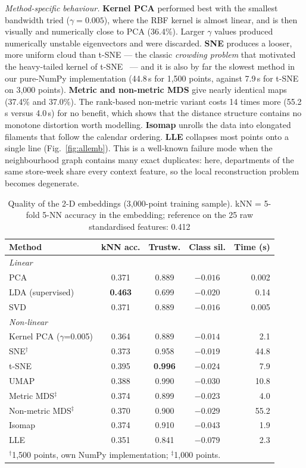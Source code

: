 \emph{Method-specific behaviour.} \textbf{Kernel PCA} performed best with the smallest bandwidth tried ($\gamma=0.005$), where the RBF kernel is almost linear, and is then visually and numerically close to PCA (36.4\%). Larger $\gamma$ values produced numerically unstable eigenvectors and were discarded. \textbf{SNE} produces a looser, more uniform cloud than t-SNE --- the classic \emph{crowding problem} that motivated the heavy-tailed kernel of t-SNE~\cite{vandermaaten2008} --- and it is also by far the slowest method in our pure-NumPy implementation (44.8\,s for 1{,}500 points, against 7.9\,s for t-SNE on 3{,}000 points). \textbf{Metric and non-metric MDS} give nearly identical maps (37.4\% and 37.0\%). The rank-based non-metric variant costs 14 times more (55.2\,s versus 4.0\,s) for no benefit, which shows that the distance structure contains no monotone distortion worth modelling. \textbf{Isomap} unrolls the data into elongated filaments that follow the calendar ordering. \textbf{LLE} collapses most points onto a single line (Fig.~\ref{fig:allemb}). This is a well-known failure mode when the neighbourhood graph contains many exact duplicates: here, departments of the same store-week share every context feature, so the local reconstruction problem becomes degenerate.

\begin{table}[!t]
\caption{Quality of the 2-D embeddings (3{,}000-point training sample). kNN = 5-fold 5-NN accuracy in the embedding; reference on the 25 raw standardised features: 0.412}
\label{tab:emb}
\centering
\setlength{\tabcolsep}{4pt}
\begin{tabular}{lcccr}
\toprule
Method & kNN acc. & Trustw. & Class sil. & Time (s) \\
\midrule
\multicolumn{5}{l}{\emph{Linear}}\\
PCA & 0.371 & 0.889 & $-0.016$ & 0.002 \\
LDA (supervised) & \textbf{0.463} & 0.699 & $-0.020$ & 0.14 \\
SVD & 0.371 & 0.889 & $-0.016$ & 0.005 \\
\midrule
\multicolumn{5}{l}{\emph{Non-linear}}\\
Kernel PCA ($\gamma$=0.005) & 0.364 & 0.889 & $-0.014$ & 2.1 \\
SNE$^\dagger$ & 0.373 & 0.958 & $-0.019$ & 44.8 \\
t-SNE & 0.395 & \textbf{0.996} & $-0.024$ & 7.9 \\
UMAP & 0.388 & 0.990 & $-0.030$ & 10.8 \\
Metric MDS$^\ddagger$ & 0.374 & 0.899 & $-0.023$ & 4.0 \\
Non-metric MDS$^\ddagger$ & 0.370 & 0.900 & $-0.029$ & 55.2 \\
Isomap & 0.374 & 0.910 & $-0.043$ & 1.9 \\
LLE & 0.351 & 0.841 & $-0.079$ & 2.3 \\
\bottomrule
\multicolumn{5}{l}{\footnotesize $^\dagger$1{,}500 points, own NumPy implementation; $^\ddagger$1{,}000 points.}
\end{tabular}
\end{table}

